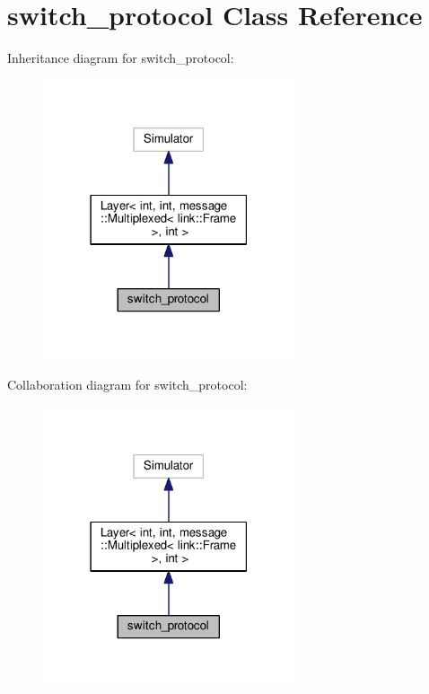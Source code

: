 \hypertarget{classswitch__protocol}{}\section{switch\+\_\+protocol Class Reference}
\label{classswitch__protocol}


Inheritance diagram for switch\+\_\+protocol\+:
\nopagebreak
\begin{figure}[H]
\begin{center}
\leavevmode
\includegraphics[width=210pt]{classswitch__protocol__inherit__graph}
\end{center}
\end{figure}


Collaboration diagram for switch\+\_\+protocol\+:
\nopagebreak
\begin{figure}[H]
\begin{center}
\leavevmode
\includegraphics[width=210pt]{classswitch__protocol__coll__graph}
\end{center}
\end{figure}
